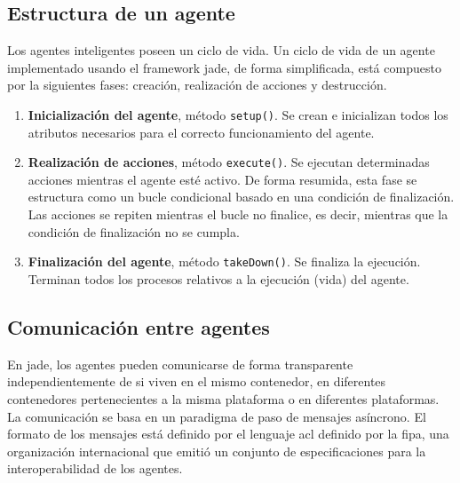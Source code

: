 \subsection{Estructura de un agente}
Los agentes inteligentes poseen un ciclo de vida. Un ciclo de vida de un agente implementado usando el \gls{framework} \acrshort{jade}, de forma simplificada, está compuesto por la siguientes fases: creación, realización de acciones y destrucción. \cite{jade}
\begin{enumerate}
    \item \textbf{Inicialización del agente}, método \lstinline{setup()}. Se crean e inicializan todos los atributos necesarios para el correcto funcionamiento del agente.
    \item \textbf{Realización de acciones}, método \lstinline{execute()}. Se ejecutan determinadas acciones mientras el agente esté activo. De forma resumida, esta fase se estructura como un bucle condicional basado en una condición de finalización. Las acciones se repiten mientras el bucle no finalice, es decir, mientras que la condición de finalización no se cumpla.
    \item \textbf{Finalización del agente}, método \lstinline{takeDown()}. Se finaliza la ejecución. Terminan todos los procesos relativos a la ejecución (vida) del agente.
\end{enumerate}

\subsection{Comunicación entre agentes}
En \acrshort{jade}, los agentes pueden comunicarse de forma transparente independientemente de si viven en el mismo contenedor, en diferentes contenedores pertenecientes a la misma plataforma o en diferentes plataformas. La comunicación se basa en un paradigma de paso de mensajes asíncrono. El formato de los mensajes está definido por el lenguaje \acrfull{acl} definido por la \acrfull{fipa}, una organización internacional que emitió un conjunto de especificaciones para la interoperabilidad de los agentes. \cite{jade, fipa}

